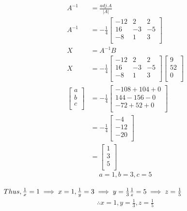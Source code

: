 \documentclass[journal,two column]{IEEEtran}
\begin{document}
\begin{LARGE}
\begin{align}
A^{-1} &= \frac{adj.A}{|A|}\\
A^{-1} &=-{\frac{1}{4}}
\begin{bmatrix}
-12 & 2 & 2\\
16 & -3 & -5\\
-8 & 1 & 3\\
\end{bmatrix} \\
X &= A^{-1}B\\
X &= -{\frac{1}{4}} \begin{bmatrix}
-12 & 2 & 2\\
16 & -3 & -5\\
-8 & 1 & 3\\
\end{bmatrix} 
\begin{bmatrix}
9\\
52\\
0\\
\end{bmatrix}\\
\begin{bmatrix}
a\\
b\\
c\\
\end{bmatrix}
&= -\frac{1}{4}
\begin{bmatrix}
-108+104+0\\
144-156-0\\
-72+52+0\\
\end{bmatrix}\\
&= -\frac{1}{4}
\begin{bmatrix}
-4\\
-12\\
-20\\
\end{bmatrix}\\
&= \begin{bmatrix}
1\\
3\\
5\\
\end{bmatrix}
\end{align}
$$a=1,b=3,c=5$$\\
$ Thus,\frac{1}{x}=1\implies x=1,\\
\frac{1}{y}=3 \implies y=\frac{1}{3}\\
 \frac{1}{z}=5 \implies  z=\frac{1}{5} $
 \begin{align}
 \therefore x = 1,y = \frac{1}{3},z = \frac{1}{5}
 \end{align}
\end{LARGE}
\end{document}
